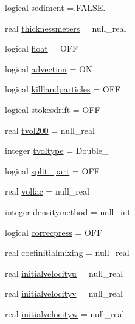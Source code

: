 \begin{DoxyCompactItemize}
logical \mbox{\hyperlink{structmodulelagrangian_1_1t__movement_a65fb5877dea1027eb3fbe9785194c69e}{sediment}} =.F\+A\+L\+S\+E.
\item 
real \mbox{\hyperlink{structmodulelagrangian_1_1t__movement_a4e0ebdd544a4253a2c36883ecf547ff5}{thicknessmeters}} = null\+\_\+real
\item 
logical \mbox{\hyperlink{structmodulelagrangian_1_1t__movement_a80733eb669eb93b36d0a5754422b9578}{float}} = O\+FF
\item 
logical \mbox{\hyperlink{structmodulelagrangian_1_1t__movement_a0de3604c8541423b7cf68c2137b0a57f}{advection}} = ON
\item 
logical \mbox{\hyperlink{structmodulelagrangian_1_1t__movement_ae7da2a474d5a4643c63a81b7abab2307}{killlandparticles}} = O\+FF
\item 
logical \mbox{\hyperlink{structmodulelagrangian_1_1t__movement_a08e1d2ef0b1cfd7ef596ae2c0356477f}{stokesdrift}} = O\+FF
\item 
real \mbox{\hyperlink{structmodulelagrangian_1_1t__movement_aeb857b9acf9ab0ce55672b8f0d5bcb46}{tvol200}} = null\+\_\+real
\item 
integer \mbox{\hyperlink{structmodulelagrangian_1_1t__movement_aafa3b779d3167155877d4e5b5d05c76a}{tvoltype}} = Double\+\_\+
\item 
logical \mbox{\hyperlink{structmodulelagrangian_1_1t__movement_a2a8aebda3a7d8d4211e34b3c5d130e9c}{split\+\_\+part}} = O\+FF
\item 
real \mbox{\hyperlink{structmodulelagrangian_1_1t__movement_a731dfaf05d07263819cb0ede8d289334}{volfac}} = null\+\_\+real
\item 
integer \mbox{\hyperlink{structmodulelagrangian_1_1t__movement_a3110665abb1e97cd54024393817303b2}{densitymethod}} = null\+\_\+int
\item 
logical \mbox{\hyperlink{structmodulelagrangian_1_1t__movement_ad95774d6e86ae12bc6c0cdd279a116b2}{correcpress}} = O\+FF
\item 
real \mbox{\hyperlink{structmodulelagrangian_1_1t__movement_a5e388a21b2f02301218123f6cf1ba7e5}{coefinitialmixing}} = null\+\_\+real
\item 
real \mbox{\hyperlink{structmodulelagrangian_1_1t__movement_ad4d59314f9a881bfef5996360f8eb254}{initialvelocityu}} = null\+\_\+real
\item 
real \mbox{\hyperlink{structmodulelagrangian_1_1t__movement_acbb3adb2d4b7fe7ceeea43f62ba7ed3b}{initialvelocityv}} = null\+\_\+real
\item 
real \mbox{\hyperlink{structmodulelagrangian_1_1t__movement_a2f5eea491ac8439cc0eeccbd09833f46}{initialvelocityw}} = null\+\_\+real

\end{DoxyCompactItemize}
